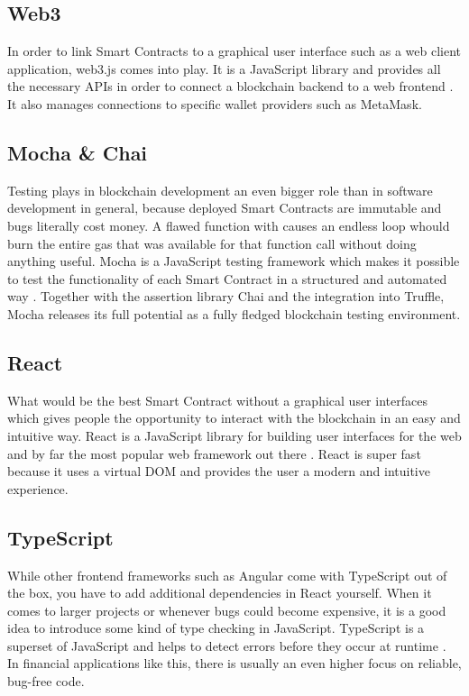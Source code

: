 \subsection{Web3}
In order to link Smart Contracts to a graphical user interface such as a web client application, web3.js comes into play. It is a JavaScript library and provides all the necessary APIs in order to connect a blockchain backend to a web frontend \cite{Web3}. It also manages connections to specific wallet providers such as MetaMask.

\subsection{Mocha \& Chai}
Testing plays in blockchain development an even bigger role than in software development in general, because deployed Smart Contracts are immutable and bugs literally cost money. A flawed function with causes an endless loop whould burn the entire gas that was available for that function call without doing anything useful. Mocha is a JavaScript testing framework which makes it possible to test the functionality of each Smart Contract in a structured and automated way \cite{Mocha}. Together with the assertion library Chai \cite{Chai} and the integration into Truffle, Mocha releases its full potential as a fully fledged blockchain testing environment.

\subsection{React}
What would be the best Smart Contract without a graphical user interfaces which gives people the opportunity to interact with the blockchain in an easy and intuitive way. React is a JavaScript library for building user interfaces for the web and by far the most popular web framework out there \cite{React}. React is super fast because it uses a virtual DOM and provides the user a modern and intuitive experience.

\subsection{TypeScript}
While other frontend frameworks such as Angular come with TypeScript out of the box, you have to add additional dependencies in React yourself. When it comes to larger projects or whenever bugs could become expensive, it is a good idea to introduce some kind of type checking in JavaScript. TypeScript is a superset of JavaScript and helps to detect errors before they occur at runtime \cite{TypeScript}. In financial applications like this, there is usually an even higher focus on reliable, bug-free code.

